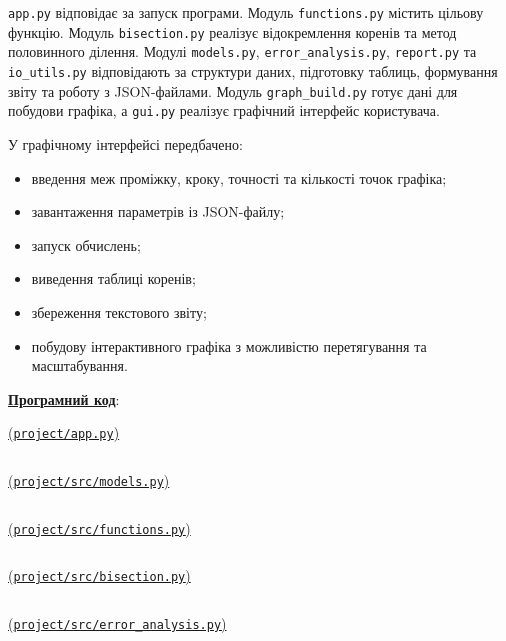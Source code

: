 \documentclass[12pt,a4paper]{article}
\begin{document}
    \texttt{app.py} відповідає за запуск програми. Модуль \texttt{functions.py} містить цільову
    функцію. Модуль \texttt{bisection.py} реалізує відокремлення коренів та метод половинного
    ділення. Модулі \texttt{models.py}, \texttt{error\_analysis.py}, \texttt{report.py} та
    \texttt{io\_utils.py} відповідають за структури даних, підготовку таблиць, формування звіту та
    роботу з JSON-файлами. Модуль \texttt{graph\_build.py} готує дані для побудови графіка, а
    \texttt{gui.py} реалізує графічний інтерфейс користувача.

    У графічному інтерфейсі передбачено:
    \begin{itemize}
        \item введення меж проміжку, кроку, точності та кількості точок графіка;
        \item завантаження параметрів із JSON-файлу;
        \item запуск обчислень;
        \item виведення таблиці коренів;
        \item збереження текстового звіту;
        \item побудову інтерактивного графіка з можливістю перетягування та масштабування.
    \end{itemize}

    \noindent
    \textbf{\underline{Програмний код}}:

    \vspace{1em}

    \noindent
    \underline{(\texttt{project/app.py})}
    \inputminted{python}{project/app.py}

    \vspace{1em}

    \noindent
    \underline{(\texttt{project/src/models.py})}
    \inputminted{python}{project/src/models.py}

    \vspace{1em}

    \noindent
    \underline{(\texttt{project/src/functions.py})}
    \inputminted{python}{project/src/functions.py}

    \vspace{1em}

    \noindent
    \underline{(\texttt{project/src/bisection.py})}
    \inputminted{python}{project/src/bisection.py}

    \vspace{1em}

    \noindent
    \underline{(\texttt{project/src/error\_analysis.py})}
    \inputminted{python}{project/src/error_analysis.py}
\end{document}
